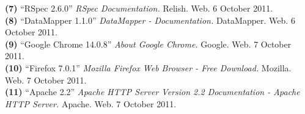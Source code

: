 \documentclass{article}
\begin{document}
\noindent\hangindent=1.4cm
\textbf{(7)} ``RSpec 2.6.0'' 
\emph{RSpec Documentation.} Relish. Web.  6 October 2011.\\

\noindent\hangindent=1.4cm
\textbf{(8)} ``DataMapper 1.1.0'' 
\emph{DataMapper - Documentation.} DataMapper. Web.  6 October 2011.\\

\noindent\hangindent=1.4cm
\textbf{(9)} ``Google Chrome 14.0.8'' 
\emph{About Google Chrome.} Google. Web.  7 October 2011.\\

\noindent\hangindent=1.4cm
\textbf{(10)} ``Firefox 7.0.1'' 
\emph{Mozilla Firefox Web Browser - Free Download.} Mozilla. Web.  7 October 2011.\\

\noindent\hangindent=1.4cm
\textbf{(11)} ``Apache 2.2'' 
\emph{Apache HTTP Server Version 2.2 Documentation - Apache HTTP Server.} Apache. Web.  7 October 2011.\\
\end{document}
